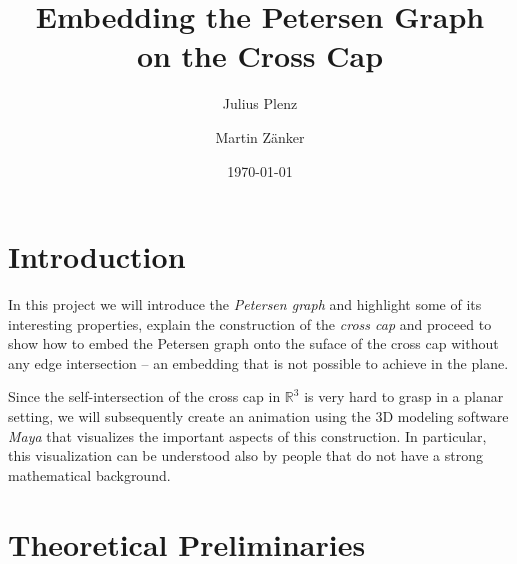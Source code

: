 \documentclass[11pt,            %
               a4paper,         %
               oneside,         %
               DIV12,           %
               fleqn,           %
               halfparskip,     %
               nochapterprefix, %
              ]{scrartcl} %
\theoremstyle{definition}
\begin{document}
\thispagestyle{empty}               %

\title{Embedding the Petersen Graph\\ on the Cross Cap}
\author{Julius Plenz \and Martin Zänker}
\date{\today}

\maketitle





\section*{Introduction}

In this project we will introduce the \emph{Petersen graph} and highlight
some of its interesting properties, explain the construction of the
\emph{cross cap} and proceed to show how to embed the Petersen graph
onto the suface of the cross cap without any edge intersection --
an embedding that is not possible to achieve in the plane.

Since the self-intersection of the cross cap in $\mathbb{R}^3$ is very
hard to grasp in a planar setting, we will subsequently create an
animation using the 3D modeling software \emph{Maya} that visualizes
the important aspects of this construction. In particular, this
visualization can be understood also by people that do not have a
strong mathematical background.

\section{Theoretical Preliminaries}
\label{sec:theoretical}
\end{document}

